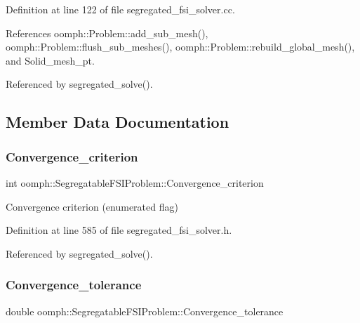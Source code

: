 Definition at line 122 of file segregated\+\_\+fsi\+\_\+solver.\+cc.



References oomph\+::\+Problem\+::add\+\_\+sub\+\_\+mesh(), oomph\+::\+Problem\+::flush\+\_\+sub\+\_\+meshes(), oomph\+::\+Problem\+::rebuild\+\_\+global\+\_\+mesh(), and Solid\+\_\+mesh\+\_\+pt.



Referenced by segregated\+\_\+solve().



\subsection{Member Data Documentation}
\mbox{\label{classoomph_1_1SegregatableFSIProblem_a971ddd09518a1771ae3a6ed85a51514e}} 
\subsubsection{\texorpdfstring{Convergence\+\_\+criterion}{Convergence\_criterion}}
{\footnotesize\ttfamily int oomph\+::\+Segregatable\+F\+S\+I\+Problem\+::\+Convergence\+\_\+criterion\hspace{0.3cm}{\ttfamily [private]}}



Convergence criterion (enumerated flag) 



Definition at line 585 of file segregated\+\_\+fsi\+\_\+solver.\+h.



Referenced by segregated\+\_\+solve().

\mbox{\label{classoomph_1_1SegregatableFSIProblem_ad9f2f249e0886878f096926b2cfca74b}} 
\subsubsection{\texorpdfstring{Convergence\+\_\+tolerance}{Convergence\_tolerance}}
{\footnotesize\ttfamily double oomph\+::\+Segregatable\+F\+S\+I\+Problem\+::\+Convergence\+\_\+tolerance\hspace{0.3cm}{\ttfamily [protected]}}



